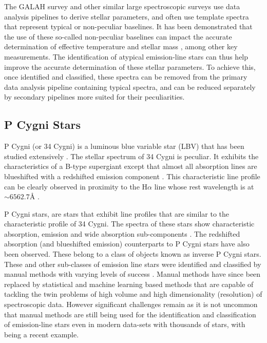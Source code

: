 \documentclass[fleqn,usenatbib]{mnras}
\begin{document}
The GALAH survey and other similar large spectroscopic surveys use data analysis pipelines to derive stellar parameters, and often use template spectra that represent typical or non-peculiar baselines. It has been demonstrated that the use of these so-called non-peculiar baselines can impact the accurate determination of effective temperature \citep{cayrel2011halpha, amarsi2018effective, giribaldi2019accurate} and stellar mass \citep{ness2016spectroscopic, bergemann2016gaia}, among other key measurements. The identification of atypical emission-line stars can thus help improve the accurate determination of these stellar parameters. To achieve this, once identified and classified, these spectra can be removed from the primary data analysis pipeline containing typical spectra, and can be reduced separately by secondary pipelines more suited for their peculiarities.

\subsection{P Cygni Stars}

P Cygni (or 34 Cygni) is a luminous blue variable star (LBV) that has been studied extensively \citep{1953PDAO....9....1B, hutchings1969expanding, elliott20225, underhill1966supergiants, mizumoto2018newly, de2001p}. The stellar spectrum of 34 Cygni is peculiar. It exhibits the characteristics of a B-type supergiant except that almost all absorption lines are blueshifted with a redshifted emission component \citep{hutchings1969expanding}. This characteristic line profile can be clearly observed in proximity to the H$\alpha$ line whose rest wavelength is at $\sim 6562.7${\rm \AA} \citep{zhang2021catalog, traven2015gaia}. 

P Cygni stars, are stars that exhibit line profiles that are similar to the characteristic profile of 34 Cygni. The spectra of these stars show characteristic absorption, emission and wide absorption sub-components \citep{zhang2021catalog}. The redshifted absorption (and blueshifted emission) counterparts to P Cygni stars have also been observed. These belong to a class of objects known as inverse P Cygni stars. These and other sub-classes of emission line stars were identified and classified by manual methods with varying levels of success \citep{1953PDAO....9....1B, van1993atlas, reipurth1996halpha, kohoutek1999catalogue, bonito2013spectroscopic}. Manual methods have since been replaced by statistical and machine learning based methods that are capable of tackling the twin problems of high volume and high dimensionality (resolution) of spectroscopic data. However significant challenges remain as it is not uncommon that manual methods are still being used for the identification and classification of emission-line stars even in modern data-sets with thousands of stars, with \citet{zhang2021catalog} being a recent example.
\end{document}
